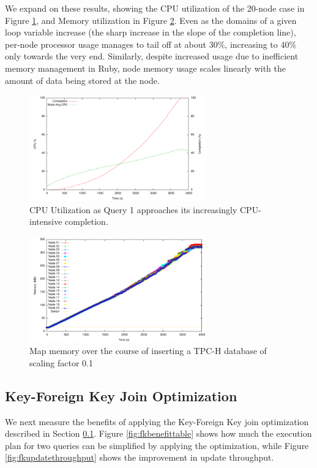 We expand on these results, showing the CPU utilization of the 20-node case in Figure \ref{fig:20nodes100mbUpdatesVsCPUCompletion}, and Memory utilization in Figure \ref{fig:20nodes100mbUpdatesVsMemory}.  Even as the domains of a given loop variable increase (the sharp increase in the slope of the completion line), per-node processor usage manages to tail off at about 30\%, increasing to 40\% only towards the very end.  Similarly, despite increased usage due to inefficient memory management in Ruby, node memory usage scales linearly with the amount of data being stored at the node.

\begin{figure}
\begin{center}
\includegraphics[width=3.0in]{images/20nodes100mbUpdatesVsCPUCompletion.pdf}
\caption{CPU Utilization as Query 1 approaches its increasingly CPU-intensive completion.}
\label{fig:20nodes100mbUpdatesVsCPUCompletion}
\end{center}
\end{figure}
\begin{figure}
\begin{center}
\includegraphics[width=3.0in]{images/20nodes100mbUpdatesVsMemory.pdf}
\caption{Map memory over the course of inserting a TPC-H database of scaling factor 0.1}
\label{fig:20nodes100mbUpdatesVsMemory}
\end{center}
\end{figure}

\subsection{Key-Foreign Key Join Optimization}
\label{sec:key_fkey}
We next measure the benefits of applying the Key-Foreign Key join optimization described in Section \ref{sec:key_fkey}.  Figure \ref{fig:fkbenefittable} shows how much the execution plan for two queries can be simplified by applying the optimization, while Figure \ref{fig:fkupdatethroughput} shows the improvement in update throughput.  
 


